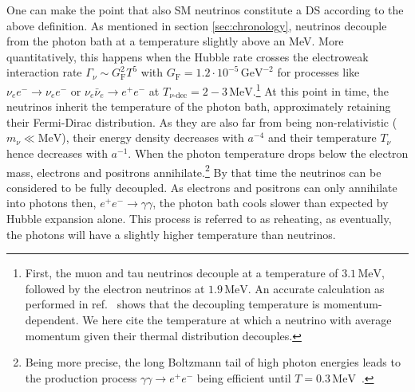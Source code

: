 One can make the point that also SM neutrinos constitute a \ac{DS} according to the above definition. As mentioned in section \ref{sec:chronology}, neutrinos decouple from the photon bath at a temperature slightly above an MeV. More quantitatively, this happens when the Hubble rate crosses the electroweak interaction rate $\Gamma_\nu \sim G_\text{F}^2 T^5$ with $G_\text{F} = 1.2 \cdot 10^{-5} \, \text{GeV}^{-2}$ for processes like $\nu_e e^- \rightarrow \nu_e e^-$ or $\nu_e \bar{\nu}_e \rightarrow e^+ e^-$ at $T_{\nu\text{-dec}} = 2 - 3 \, \text{MeV}$.\footnote{\label{ftn:nudec}First, the muon and tau neutrinos decouple at a temperature of $3.1 \, \text{MeV}$, followed by the electron neutrinos at $1.9 \, \text{MeV}$. An accurate calculation as performed in ref.~\cite{Lesgourgues:2013sjj} shows that the decoupling temperature is momentum-dependent. We here cite the temperature at which a neutrino with average momentum given their thermal distribution decouples.} At this point in time, the neutrinos inherit the temperature of the photon bath, approximately retaining their Fermi-Dirac distribution. As they are also far from being non-relativistic ($m_\nu \ll \text{MeV}$), their energy density decreases with $a^{-4}$ and their temperature $T_\nu$ hence decreases with $a^{-1}$. When the photon temperature drops below the electron mass, electrons and positrons annihilate.\footnote{\label{ftn:elposann}Being more precise, the long Boltzmann tail of high photon energies leads to the production process $\gamma \gamma \rightarrow e^+ e^-$ being efficient until $T = 0.3 \, \text{MeV}$~\cite{Maggiore:2018sht}.} By that time the neutrinos can be considered to be fully decoupled. As electrons and positrons can only annihilate into photons then, $e^+e^- \rightarrow \gamma \gamma$, the photon bath cools slower than expected by Hubble expansion alone. This process is referred to as reheating, as eventually, the photons will have a slightly higher temperature than neutrinos.

